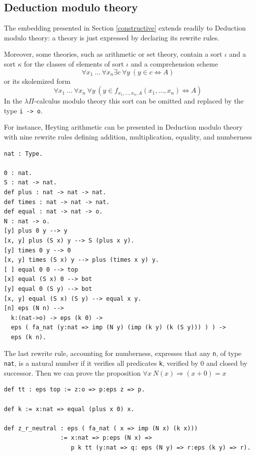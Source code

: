 \documentclass[english]{lipics}
\newcommand\fa{\forall}
\newcommand\ex{\exists}
\newcommand\lst[1]{{\rm \lstinline{#1}}}
\begin{document}
\subsection{Deduction modulo theory}
\label{deduction-modulo}

The embedding presented in Section \ref{constructive} extends readily
to Deduction modulo theory: a theory is just expressed by declaring
its rewrite rules.

Moreover, some theories, such as arithmetic or
set theory, contain a sort $\iota$ and a sort $\kappa$ for the classes
of elements of sort $\iota$ and a comprehension scheme
$$\fa x_1~\ldots~\fa x_n \ex c~\fa y~(y \in c \Leftrightarrow A)$$
or its skolemized form
$$\fa x_1~\ldots~\fa x_n~\fa y~
(y \in f_{x_1, \ldots, x_n, A}(x_1, \ldots, x_n) \Leftrightarrow A)$$
In the $\lambda \Pi$-calculus modulo theory this sort can be omitted and
replaced by the type \lst{i -> o}.

For instance, Heyting arithmetic \cite{DWarith,Allali} can be
presented in Deduction modulo theory with nine rewrite rules defining
addition, multiplication, equality, and numberness
\begin{lstlisting}
nat : Type.

0 : nat.
S : nat -> nat.
def plus : nat -> nat -> nat.
def times : nat -> nat -> nat.
def equal : nat -> nat -> o.
N : nat -> o.
[y] plus 0 y --> y
[x, y] plus (S x) y --> S (plus x y).
[y] times 0 y --> 0
[x, y] times (S x) y --> plus (times x y) y.
[ ] equal 0 0 --> top
[x] equal (S x) 0 --> bot
[y] equal 0 (S y) --> bot
[x, y] equal (S x) (S y) --> equal x y.
[n] eps (N n) -->
  k:(nat->o) -> eps (k 0) ->
  eps ( fa_nat (y:nat => imp (N y) (imp (k y) (k (S y))) ) ) ->
  eps (k n).
\end{lstlisting}

The last rewrite rule, accounting for numberness, expresses that any
\lst{n}, of type \lst{nat}, is a natural number if it verifies
all predicates \lst{k}, verified by $0$ and closed by successor.
Then we can prove the proposition $\fa x~N(x)
\Rightarrow (x + 0) = x$
\begin{lstlisting}
def tt : eps top := z:o => p:eps z => p.

def k := x:nat => equal (plus x 0) x.

def z_r_neutral : eps ( fa_nat ( x => imp (N x) (k x)))
                := x:nat => p:eps (N x) =>
                   p k tt (y:nat => q: eps (N y) => r:eps (k y) => r).
\end{lstlisting}
\end{document}
